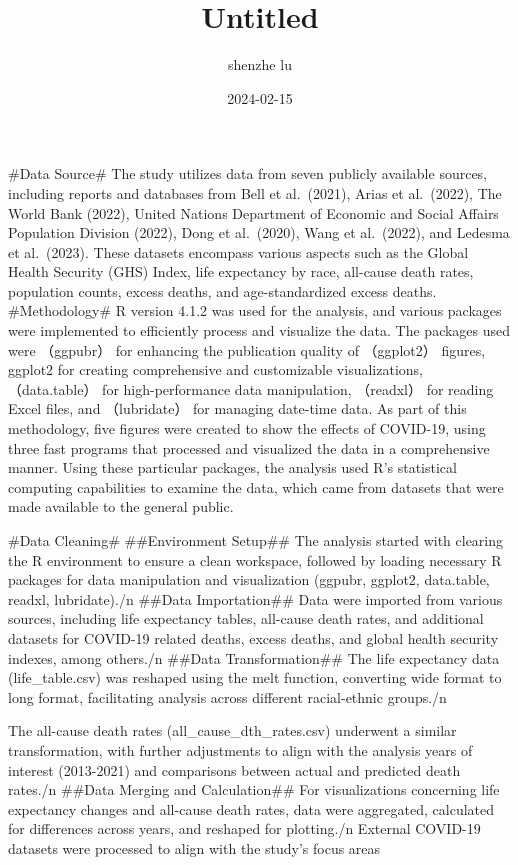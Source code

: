 \documentclass[
]{article}
\title{Untitled}
\author{shenzhe lu}
\date{2024-02-15}
\begin{document}
\maketitle

\#Data Source\# The study utilizes data from seven publicly available
sources, including reports and databases from Bell et al.~(2021), Arias
et al.~(2022), The World Bank (2022), United Nations Department of
Economic and Social Affairs Population Division (2022), Dong et
al.~(2020), Wang et al.~(2022), and Ledesma et al.~(2023). These
datasets encompass various aspects such as the Global Health Security
(GHS) Index, life expectancy by race, all-cause death rates, population
counts, excess deaths, and age-standardized excess deaths.
\#Methodology\# R version 4.1.2 was used for the analysis, and various
packages were implemented to efficiently process and visualize the data.
The packages used were （ggpubr） for enhancing the publication quality
of （ggplot2） figures, ggplot2 for creating comprehensive and
customizable visualizations, （data.table） for high-performance data
manipulation, （readxl） for reading Excel files, and （lubridate） for
managing date-time data. As part of this methodology, five figures were
created to show the effects of COVID-19, using three fast programs that
processed and visualized the data in a comprehensive manner. Using these
particular packages, the analysis used R's statistical computing
capabilities to examine the data, which came from datasets that were
made available to the general public.

\#Data Cleaning\# \#\#Environment Setup\#\# The analysis started with
clearing the R environment to ensure a clean workspace, followed by
loading necessary R packages for data manipulation and visualization
(ggpubr, ggplot2, data.table, readxl, lubridate)./n \#\#Data
Importation\#\# Data were imported from various sources, including life
expectancy tables, all-cause death rates, and additional datasets for
COVID-19 related deaths, excess deaths, and global health security
indexes, among others./n \#\#Data Transformation\#\# The life expectancy
data (life\_table.csv) was reshaped using the melt function, converting
wide format to long format, facilitating analysis across different
racial-ethnic groups./n

The all-cause death rates (all\_cause\_dth\_rates.csv) underwent a
similar transformation, with further adjustments to align with the
analysis years of interest (2013-2021) and comparisons between actual
and predicted death rates./n \#\#Data Merging and Calculation\#\# For
visualizations concerning life expectancy changes and all-cause death
rates, data were aggregated, calculated for differences across years,
and reshaped for plotting./n External COVID-19 datasets were processed
to align with the study's focus areas
\end{document}
